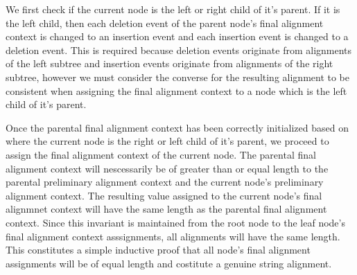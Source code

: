 \documentclass[11pt]{article}
\begin{document}
We first check if the current node is the left or right child of it's parent.
If it is the left child, then each deletion event of the parent node's final alignment context is changed to an insertion event and each insertion event is changed to a deletion event.
This is required because deletion events originate from alignments of the left subtree and insertion events originate from alignments of the right subtree, however we must consider the converse for the resulting alignment to be consistent when assigning the final alignment context to a node which is the left child of it's parent.

Once the parental final alignment context has been correctly initialized based on where the current node is the right or left child of it's parent, we proceed to assign the final alignment context of the current node.
The parental final alignment context will nescessarily be of greater than or equal length to the parental preliminary alignment context and the current node's preliminary alignment context.
The resulting value assigned to the current node's final alignmnet context will have the same length as the parental final alignment context.
Since this invariant is maintained from the root node to the leaf node's final alignment context asssignments, all alignments will have the same length.
This constitutes a simple inductive proof that all node's final alignment assignments will be of equal length and costitute a genuine string alignment.
\end{document}

